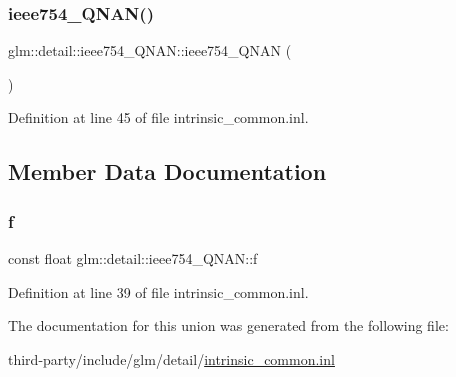 \subsubsection{\texorpdfstring{ieee754\+\_\+\+Q\+N\+A\+N()}{ieee754\_QNAN()}}
{\footnotesize\ttfamily glm\+::detail\+::ieee754\+\_\+\+Q\+N\+A\+N\+::ieee754\+\_\+\+Q\+N\+AN (\begin{DoxyParamCaption}{ }\end{DoxyParamCaption})\hspace{0.3cm}{\ttfamily [inline]}}



Definition at line 45 of file intrinsic\+\_\+common.\+inl.



\subsection{Member Data Documentation}
\mbox{\label{unionglm_1_1detail_1_1ieee754___q_n_a_n_ac5f04f4e605e4d08ddc2bacddf7eee65}} 
\subsubsection{\texorpdfstring{f}{f}}
{\footnotesize\ttfamily const float glm\+::detail\+::ieee754\+\_\+\+Q\+N\+A\+N\+::f}



Definition at line 39 of file intrinsic\+\_\+common.\+inl.



The documentation for this union was generated from the following file\+:\begin{DoxyCompactItemize}
\item 
third-\/party/include/glm/detail/\hyperlink{intrinsic__common_8inl}{intrinsic\+\_\+common.\+inl}\end{DoxyCompactItemize}
